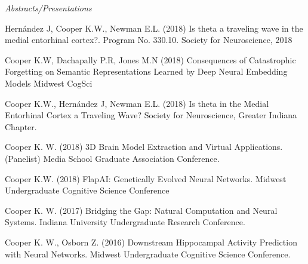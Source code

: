 \begin{cvpubentries}
\cvpubentry
    {\textit{Abstracts/Presentations}} %
    {} %
    {} %
    {} %
    {
      \begin{cvpubitems} %
	\item{Hernández J, Cooper K.W., Newman E.L. (2018) Is theta a traveling wave in the medial entorhinal cortex?. Program No. 330.10. Society for Neuroscience, 2018}
        \item {Cooper K.W, Dachapally P.R, Jones M.N (2018) Consequences of Catastrophic Forgetting on Semantic Representations Learned by Deep Neural Embedding Models Midwest CogSci}
	\item{Cooper K.W., Hernández J, Newman E.L. (2018) Is theta in the Medial Entorhinal Cortex a Traveling Wave? Society for Neuroscience, Greater Indiana Chapter.}
	\item{Cooper K. W. (2018) 3D Brain Model Extraction and Virtual Applications. (Panelist) Media School Graduate Association Conference.}
	\item{Cooper K.W. (2018) FlapAI: Genetically Evolved Neural Networks. Midwest Undergraduate Cognitive Science Conference}
	\item{Cooper K. W. (2017) Bridging the Gap: Natural Computation and Neural Systems. Indiana University Undergraduate Research Conference.}
	\item{Cooper K. W., Osborn Z. (2016) Downstream Hippocampal Activity Prediction with Neural Networks. Midwest Undergraduate Cognitive Science Conference.}
      \end{cvpubitems}
    }

\end{cvpubentries}
